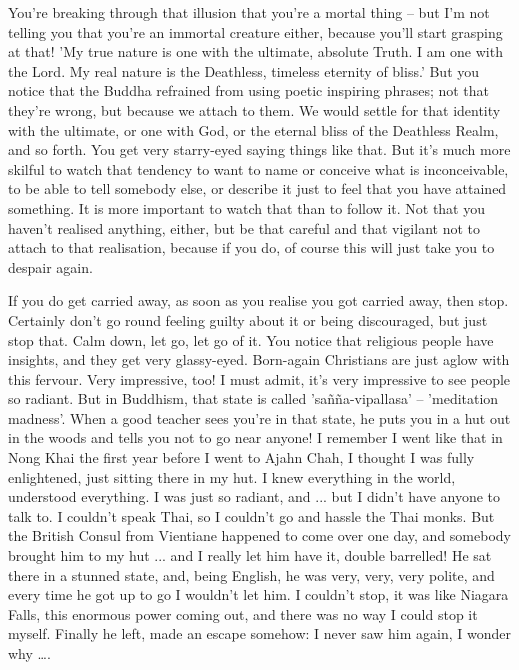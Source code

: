 You're breaking through that illusion that you're a mortal thing -- but I'm not telling you that you're an immortal creature either, because you'll start grasping at that! 'My true nature is one with the ultimate, absolute Truth. I am one with the Lord. My real nature is the Deathless, timeless eternity of bliss.' But you notice that the Buddha refrained from using poetic inspiring phrases; not that they're wrong, but because we attach to them. We would settle for that identity with the ultimate, or one with God, or the eternal bliss of the Deathless Realm, and so forth. You get very starry-eyed saying things like that. But it's much more skilful to watch that tendency to want to name or conceive what is inconceivable, to be able to tell somebody else, or describe it just to feel that you have attained something. It is more important to watch that than to follow it. Not that you haven't realised anything, either, but be that careful and that vigilant not to attach to that realisation, because if you do, of course this will just take you to despair again.

If you do get carried away, as soon as you realise you got carried away, then stop. Certainly don't go round feeling guilty about it or being discouraged, but just stop that. Calm down, let go, let go of it. You notice that religious people have insights, and they get very glassy-eyed. Born-again Christians are just aglow with this fervour. Very impressive, too! I must admit, it's very impressive to see people so radiant. But in Buddhism, that state is called 'sañña-vipallasa' -- 'meditation madness'. When a good teacher sees you're in that state, he puts you in a hut out in the woods and tells you not to go near anyone! I remember I went like that in Nong Khai the first year before I went to Ajahn Chah, I thought I was fully enlightened, just sitting there in my hut. I knew everything in the world, understood everything. I was just so radiant, and ... but I didn't have anyone to talk to. I couldn't speak Thai, so I couldn't go and hassle the Thai monks. But the British Consul from Vientiane happened to come over one day, and somebody brought him to my hut ... and I really let him have it, double barrelled! He sat there in a stunned state, and, being English, he was very, very, very polite, and every time he got up to go I wouldn't let him. I couldn't stop, it was like Niagara Falls, this enormous power coming out, and there was no way I could stop it myself. Finally he left, made an escape somehow: I never saw him again, I wonder why \ldots{}.

